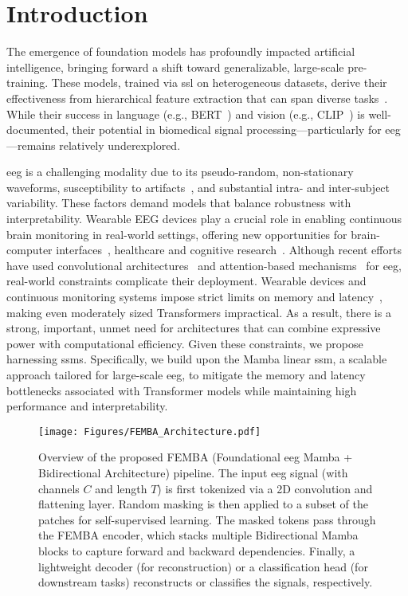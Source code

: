 \section{Introduction}\label{sec:intro}
The emergence of foundation models has profoundly impacted artificial intelligence, bringing forward a shift toward generalizable, large-scale pre-training. These models, trained via \gls{ssl} on heterogeneous datasets, derive their effectiveness from hierarchical feature extraction that can span diverse tasks~\cite{bommasani2021opportunities}. While their success in language (e.g., BERT~\cite{devlin2019bertpretrainingdeepbidirectional}) and vision (e.g., CLIP~\cite{radford2021learning}) is well-documented, their potential in biomedical signal processing—particularly for \gls{eeg}—remains relatively underexplored.

\gls{eeg} is a challenging modality due to its pseudo-random, non-stationary waveforms, susceptibility to artifacts~\cite{ingolfsson_minimizing_2024}, and substantial intra- and inter-subject variability. These factors demand models that balance robustness with interpretability. Wearable EEG devices play a crucial role in enabling continuous brain monitoring in real-world settings, offering new opportunities for brain-computer interfaces~\cite{zhang2023recent}, healthcare and cognitive research~\cite{emish2024remote}. Although recent efforts have used convolutional architectures~\cite{roy2019deep} and attention-based mechanisms~\cite{chen2024eegformer} for \gls{eeg}, real-world constraints complicate their deployment. Wearable devices and continuous monitoring systems impose strict limits on memory and latency~\cite{casson2010wearable}, making even moderately sized Transformers impractical. As a result, there is a strong, important, unmet need for architectures that can combine expressive power with computational efficiency. Given these constraints, we propose harnessing \glspl{ssm}. Specifically, we build upon the Mamba linear \gls{ssm}, a scalable approach tailored for large-scale \gls{eeg}, to mitigate the memory and latency bottlenecks associated with Transformer models while maintaining high performance and interpretability.


\begin{figure*}[t]
    \centering
    \texttt{[image: Figures/FEMBA\_Architecture.pdf]}
    \caption{Overview of the proposed FEMBA (Foundational \gls{eeg} Mamba + Bidirectional Architecture) pipeline. The input \gls{eeg} signal (with channels $C$ and length $T$) is first tokenized via a 2D convolution and flattening layer. Random masking is then applied to a subset of the patches for self-supervised learning. The masked tokens pass through the FEMBA encoder, which stacks multiple Bidirectional Mamba blocks to capture forward and backward dependencies. Finally, a lightweight decoder (for reconstruction) or a classification head (for downstream tasks) reconstructs or classifies the signals, respectively.}
    \label{fig:femba_architecture}
\end{figure*}

